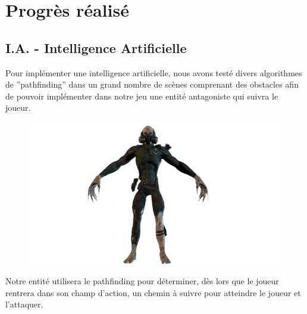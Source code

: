 \section{Progrès réalisé}

\subsection{I.A. - Intelligence Artificielle}
\setlength{\parindent}{5ex}
Pour implémenter une intelligence artificielle, nous avons testé divers algorithmes de ''pathfinding'' dans un grand nombre de scènes comprenant des obstacles afin de pouvoir implémenter dans notre jeu une entité antagoniste qui suivra le joueur.

\begin{figure}[H]
\centering
\begin{minipage}{.5\textwidth}
  \centering
  \centerline{\includegraphics[width=1\linewidth]{img/assets/sterven.png}}
  \label{fig:méchant}
\end{minipage}%
\end{figure}

Notre entité utilisera le pathfinding pour déterminer, dès lors que le joueur rentrera dans son champ d'action, un chemin à suivre pour atteindre le joueur et l'attaquer.

